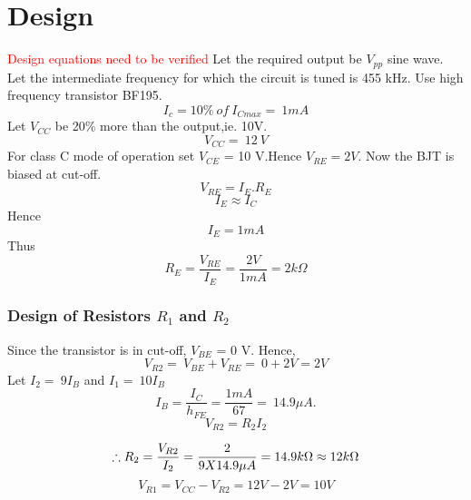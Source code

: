 \documentclass{book}
\begin{document}
\section*{Design}
\textcolor{red}{Design equations need to be verified}
Let the required output be $V_{pp}$ sine wave.
Let the intermediate frequency for which the circuit is tuned is 455 kHz.
Use high frequency transistor BF195.
\begin{equation}
I_c=10 \% \ of \  I_{Cmax} =\  1mA
\end{equation}
\noindent Let $V_{CC}$ be 20\% more than the output,ie. 10V.
\begin{equation}
V_{CC}=\ 12 \ V
\end{equation}
For class C mode of operation set $V_{CE}$ = 10 V.Hence $V_{RE}=2V$. Now the BJT is biased at cut-off.
\begin{equation}
V_{RE}=I_{E}. R_E
\end{equation}
\begin{equation}
I_E \approx I_C 
 \end{equation}
\noindent Hence
 \begin{equation}
I_E = 1mA
\end{equation}
\noindent Thus
\begin{equation}
R_E=\frac{V_{RE}}{I_E}=\frac{2V}{1mA}=2k\Omega
\end{equation}
\subsubsection{Design of Resistors $R_1$ and $R_2$}

 \noindent Since the transistor is in cut-off, $V_{BE}$ = 0 V. Hence,
 \begin{equation}
V_{R2}=\ V_{BE}+V_{RE} =\ 0+2V= 2V
\end{equation}
\noindent Let $I_2 =\ 9 I_B$ and $I_1=\ 10I_B$
\begin{equation}
I_B=\frac{I_C}{h_{FE}}=\frac{1mA}{67}=\ 14.9 \mu A.
\end{equation}
\begin{equation}
V_{R2}=R_2I_2 
\end{equation}

\begin{equation}
\therefore R_2=\frac{V_{R2}}{I_2}\\ 
= \frac{2}{9X14.9\mu A} =14.9 k\Omega \approx 12 k\Omega
\end{equation}
\begin{equation}
V_{R1}= V_{CC}-V_{R2} =12V-2V=10V
\end{equation}
\end{document}
